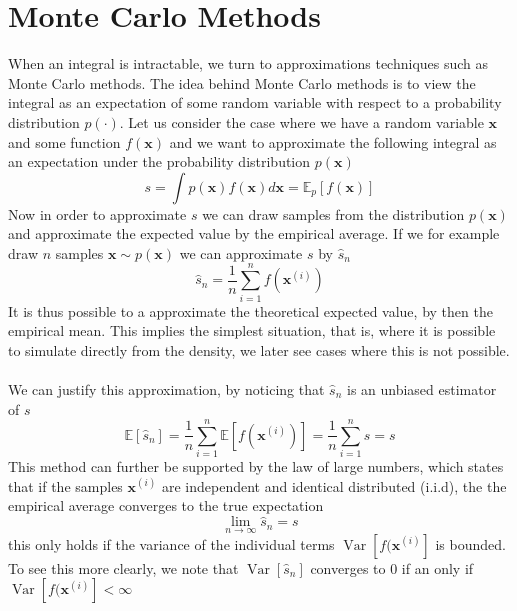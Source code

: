 \section{Monte Carlo Methods}
When an integral is intractable, we turn to approximations techniques such as Monte Carlo methods. The idea behind Monte Carlo methods is to view the integral as an expectation of some random variable with respect to a probability distribution $p(\cdot)$. Let us consider the case where we have a random variable $\mathbf{x}$ and some function $f(\mathbf{x})$ and we want to approximate the following integral as an expectation under the probability distribution $p(\mathbf{x})$ 
\begin{equation*}
    s=\int p(\mathbf{x}) f(\mathbf{x}) d \mathbf{x}=\mathbb{E}_{p}[f(\mathbf{x})]
\end{equation*}
Now in order to approximate $s$ we can draw samples from the distribution $p(\mathbf{x})$ and approximate the expected value by the empirical average. If we for example draw $n$ samples $\mathbf{x}\sim p(\mathbf{x})$ we can approximate $s$ by $\hat{s}_n$
\begin{equation*}
        \hat{s}_{n}=\frac{1}{n} \sum_{i=1}^{n} f\left(\mathbf{x}^{(i)}\right)
\end{equation*}
It is thus possible to a approximate the theoretical expected value, by then the empirical mean. This implies the simplest situation, that is, where it is possible to simulate directly from the density, we later see cases where this is not possible.\\
\\
We can justify this approximation, by noticing that $\hat{s}_n$ is an unbiased estimator of $s$
\begin{equation*}
    \mathbb{E}\left[\hat{s}_{n}\right]=\frac{1}{n} \sum_{i=1}^{n} \mathbb{E}\left[f\left(\mathbf{x}^{(i)}\right)\right]=\frac{1}{n} \sum_{i=1}^{n} s=s
\end{equation*}
This method can further be supported by the law of large numbers, which states that if the samples $\mathbf{x}^{(i)}$ are independent and identical distributed (i.i.d), the the empirical average converges to the true expectation
\begin{equation*}
    \lim _{n \rightarrow \infty} \hat{s}_{n}=s
\end{equation*}
this only holds if the variance of the individual terms $\operatorname{Var}[f(\mathbf{x}^{(i)}]$ is bounded. To see this more clearly, we note that $\operatorname{Var}[\hat{s}_n]$ converges to 0 if an only if $\operatorname{Var}[f(\mathbf{x}^{(i)}]<\infty$
